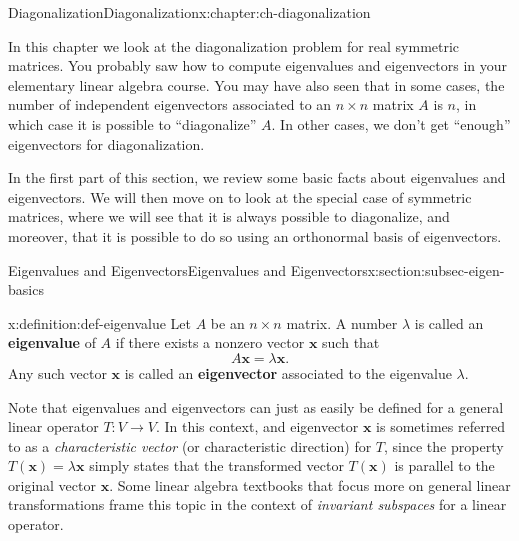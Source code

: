\documentclass[oneside,10pt,]{book}
\newcommand{\terminology}[1]{\textbf{#1}}
\numberwithin{equation}{section}
\newcommand{\xx}{\mathbf{x}}
\begin{document}
%
%
\typeout{************************************************}
\typeout{************************************************}
%
\begin{chapterptx}{Diagonalization}{}{Diagonalization}{}{}{x:chapter:ch-diagonalization}
\begin{introduction}{}%
In this chapter we look at the diagonalization problem for real symmetric matrices. You probably saw how to compute eigenvalues and eigenvectors in your elementary linear algebra course. You may have also seen that in some cases, the number of independent eigenvectors associated to an \(n\times n\) matrix \(A\) is \(n\), in which case it is possible to ``diagonalize'' \(A\). In other cases, we don't get ``enough'' eigenvectors for diagonalization.%
\par
In the first part of this section, we review some basic facts about eigenvalues and eigenvectors. We will then move on to look at the special case of symmetric matrices, where we will see that it is always possible to diagonalize, and moreover, that it is possible to do so using an orthonormal basis of eigenvectors.%
\end{introduction}%
%
%
\typeout{************************************************}
\typeout{************************************************}
%
\begin{sectionptx}{Eigenvalues and Eigenvectors}{}{Eigenvalues and Eigenvectors}{}{}{x:section:subsec-eigen-basics}
\begin{definition}{}{x:definition:def-eigenvalue}%
Let \(A\) be an \(n\times n\) matrix. A number \(\lambda\) is called an \terminology{eigenvalue} of \(A\) if there exists a nonzero vector \(\xx\) such that%
\begin{equation*}
A\xx = \lambda\xx\text{.}
\end{equation*}
Any such vector \(\xx\) is called an \terminology{eigenvector} associated to the eigenvalue \(\lambda\).%
\end{definition}
Note that eigenvalues and eigenvectors can just as easily be defined for a general linear operator \(T:V\to V\). In this context, and eigenvector \(\xx\) is sometimes referred to as a \emph{characteristic vector} (or characteristic direction) for \(T\), since the property \(T(\xx)=\lambda \xx\) simply states that the transformed vector \(T(\xx)\) is parallel to the original vector \(\xx\). Some linear algebra textbooks that focus more on general linear transformations frame this topic in the context of \emph{invariant subspaces} for a linear operator.%

\end{sectionptx}
\end{chapterptx}
\end{document}
